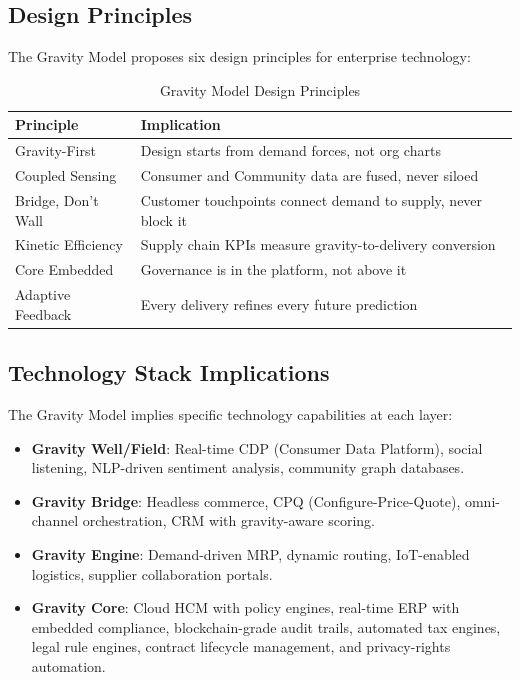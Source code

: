 \documentclass[11pt,a4paper,twocolumn]{article}
\begin{document}
\subsection{Design Principles}

The Gravity Model proposes six design principles for enterprise technology:

\begin{table}[H]
\centering
\small
\begin{tabular}{@{}p{2.5cm}p{4.5cm}@{}}
\toprule
\textbf{Principle} & \textbf{Implication} \\
\midrule
Gravity-First      & Design starts from demand forces, not org charts \\[3pt]
Coupled Sensing    & Consumer and Community data are fused, never siloed \\[3pt]
Bridge, Don't Wall & Customer touchpoints connect demand to supply, never block it \\[3pt]
Kinetic Efficiency & Supply chain KPIs measure gravity-to-delivery conversion \\[3pt]
Core Embedded      & Governance is in the platform, not above it \\[3pt]
Adaptive Feedback  & Every delivery refines every future prediction \\
\bottomrule
\end{tabular}
\caption{Gravity Model Design Principles}
\label{tab:design-principles}
\end{table}

\subsection{Technology Stack Implications}

The Gravity Model implies specific technology capabilities at each layer:

\begin{itemize}[leftmargin=1.5em]
  \item \textbf{Gravity Well/Field}: Real-time CDP (Consumer Data Platform), social listening, NLP-driven sentiment analysis, community graph databases.
  \item \textbf{Gravity Bridge}: Headless commerce, CPQ (Configure-Price-Quote), omni-channel orchestration, CRM with gravity-aware scoring.
  \item \textbf{Gravity Engine}: Demand-driven MRP, dynamic routing, IoT-enabled logistics, supplier collaboration portals.
  \item \textbf{Gravity Core}: Cloud HCM with policy engines, real-time ERP with embedded compliance, blockchain-grade audit trails, automated tax engines, legal rule engines, contract lifecycle management, and privacy-rights automation.
\end{itemize}
\end{document}
